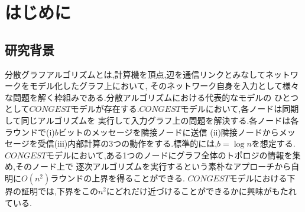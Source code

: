 \documentclass[12]{thesis}
\theoremstyle{definition}
\begin{document}
\baselineskip=22pt
\pagestyle{empty}

\maketitle

\pagestyle{myheadings}	%
\tableofcontents

\newpage


\chapter{はじめに}

\section{研究背景}
分散グラフアルゴリズムとは,計算機を頂点,辺を通信リンクとみなしてネットワークをモデル化したグラフ上において,
そのネットワーク自身を入力として様々な問題を解く枠組みである.分散アルゴリズムにおける代表的なモデルの
ひとつとして$CONGEST$モデルが存在する.$CONGEST$モデルにおいて,各ノードは同期して同じアルゴリズムを
実行して入力グラフ上の問題を解決する.各ノードは各ラウンドで(i)$b$ビットのメッセージを隣接ノードに送信
(ii)隣接ノードからメッセージを受信(iii)内部計算の3つの動作をする.標準的には,$b = \log n$を想定する.
$CONGEST$モデルにおいて,ある1つのノードにグラフ全体のトポロジの情報を集め,そのノード上で
逐次アルゴリズムを実行するという素朴なアプローチから自明に$O (n^{2})$ラウンドの上界を得ることができる.
$CONGEST$モデルにおける下界の証明では,下界をこの$n^{2}$にどれだけ近づけることができるかに興味がもたれている.
\end{document}
